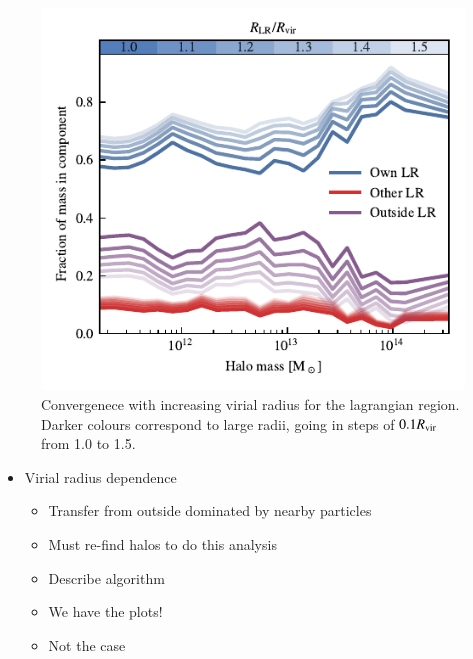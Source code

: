 \begin{figure}
    \centering
    \vspace{-0.5cm}
    \includegraphics{report/figures/radius_convergence.pdf}
    \vspace{-0.5cm}
    \caption{Convergenece with increasing virial radius for the lagrangian region.
     Darker colours correspond
    to large radii, going in steps of $0.1R_{\rm vir}$ from 1.0 to 1.5.}
    \label{fig:my_label}
\end{figure}

\begin{itemize}
	\item Virial radius dependence
		\begin{itemize}
			\item Transfer from outside dominated by nearby particles
			\item Must re-find halos to do this analysis
			\item Describe algorithm
			\item We have the plots!
			\item Not the case
		\end{itemize}
\end{itemize}
